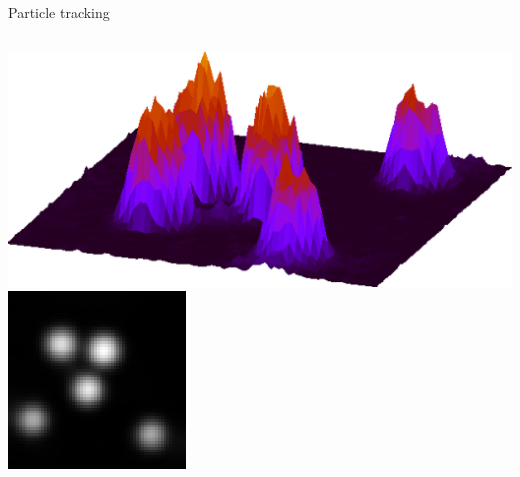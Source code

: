 \begin{frame}{Particle tracking}
\begin{columns}[T]
	\bigskip
	\includegraphics[width=\textwidth]{dillute_raw_gp_raster}
	\includegraphics[width=\textwidth]{dillute_filtered}
	

\end{columns}
\end{frame}
